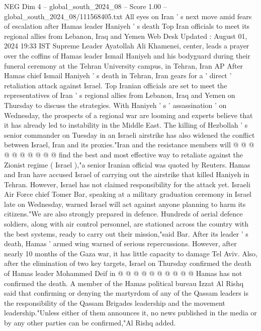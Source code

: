 \begin{textsample}{NEG Dim 4 – global\_south\_2024\_08 – Score 1.00 – global\_south\_2024\_08/111568405.txt}  \label{ex:f4_neg_332}
All eyes on Iran ' s next move amid fears of escalation after Hamas leader Haniyeh ' s death Top Iran officials to meet its regional allies from Lebanon, Iraq and Yemen Web Desk Updated : August 01, 2024 19:33 IST Supreme Leader Ayatollah Ali Khamenei, center, leads a prayer over the coffins of Hamas leader Ismail Haniyeh and his bodyguard during their funeral ceremony at the Tehran University campus, in Tehran, Iran AP After Hamas chief Ismail Haniyeh ' s death in Tehran, Iran gears for a ' direct ' retaliation attack against Israel.
Top Iranian officials are set to meet the representatives of Iran ' s regional allies from Lebanon, Iraq and Yemen on Thursday to discuss the strategies.
With Haniyeh ' s ' assassination ' on Wednesday, the prospects of a regional war are looming and experts believe that it has already led to instability in the Middle East.
The killing of Hezbollah ' s senior commander on Tuesday in an Israeli airstrike has also widened the conflict between Israel, Iran and its proxies."Iran and the resistance members will @ @ @ @ @ @ @ @ @ @ find the best and most effective way to retaliate against the Zionist regime ( Israel ),"a senior Iranian official was quoted by Reuters.
Hamas and Iran have accused Israel of carrying out the airstrike that killed Haniyeh in Tehran.
However, Israel has not claimed responsibility for the attack yet.
Israeli Air Force chief Tomer Bar, speaking at a military graduation ceremony in Israel late on Wednesday, warned Israel will act against anyone planning to harm its citizens."We are also strongly prepared in defence.
Hundreds of aerial defence soldiers, along with air control personnel, are stationed across the country with the best systems, ready to carry out their mission,"said Bar.
After its leader ' s death, Hamas ' armed wing warned of serious repercussions.
However, after nearly 10 months of the Gaza war, it has little capacity to damage Tel Aviv.
Also, after the elimination of two key targets, Israel on Thursday confirmed the death of Hamas leader Mohammed Deif in @ @ @ @ @ @ @ @ @ @ Hamas has not confirmed the death.
A member of the Hamas political bureau Izzat Al Rishq said that confirming or denying the martyrdom of any of the Qassam leaders is the responsibility of the Qassam Brigades leadership and the movement leadership."Unless either of them announces it, no news published in the media or by any other parties can be confirmed,"Al Rishq added.

\end{textsample}
